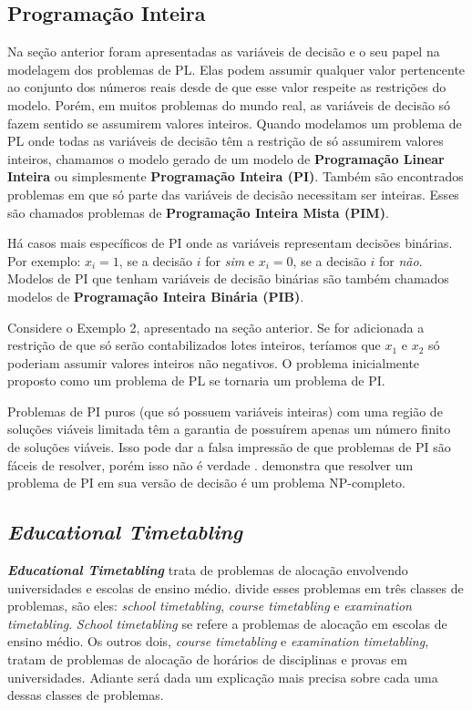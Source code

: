 \subsection{Programação Inteira}	

Na seção anterior foram apresentadas as variáveis de decisão e o seu papel na modelagem dos problemas de PL. Elas podem assumir qualquer valor pertencente ao conjunto dos números reais desde de que esse valor respeite as restrições do modelo. Porém, em muitos problemas do mundo real, as variáveis de decisão só fazem sentido se assumirem valores inteiros. Quando modelamos um problema de PL onde todas as variáveis de decisão têm a restrição de só assumirem valores inteiros, chamamos o modelo gerado de um modelo de \textbf{Programação Linear Inteira} ou simplesmente \textbf{Programação Inteira (PI)}. Também são encontrados problemas em que só parte das variáveis de decisão necessitam ser inteiras. Esses são chamados problemas de \textbf{Programação Inteira Mista (PIM)}. 

Há casos mais específicos de PI onde as variáveis representam decisões binárias. Por exemplo: $x_i = 1$, se a decisão $i$ for \textit{sim} e $x_i = 0$, se a decisão $i$ for \textit{não}. Modelos de PI que tenham variáveis de decisão binárias são também chamados modelos de \textbf{Programação Inteira Binária (PIB)}.

Considere o Exemplo 2, apresentado na seção anterior. Se for adicionada a restrição de que só serão contabilizados lotes inteiros, teríamos que $x_1$ e $x_2$ só poderiam assumir valores inteiros não negativos. O problema inicialmente proposto como um problema de PL se tornaria um problema de PI.

Problemas de PI puros (que só possuem variáveis inteiras) com uma região de soluções viáveis limitada têm a garantia de possuírem apenas um número finito de soluções viáveis. Isso pode dar a falsa impressão de que problemas de PI são fáceis de resolver, porém isso não é verdade \cite{hillier2010introduccao}.  demonstra que resolver um problema de PI em sua versão de decisão é um problema NP-completo.

\subsection{\textit{Educational Timetabling}}

\textbf{\textit{Educational Timetabling}} trata de problemas de alocação envolvendo universidades e escolas de ensino médio.  divide esses problemas em três classes de problemas, são eles: \textit{school timetabling}, \textit{course timetabling} e \textit{examination timetabling}. \textit{School timetabling} se refere a problemas de alocação em escolas de ensino médio. Os outros dois, \textit{course timetabling} e \textit{examination timetabling}, tratam de problemas de alocação de horários de disciplinas e provas em universidades. Adiante será dada um explicação mais precisa sobre cada uma dessas classes de problemas.

